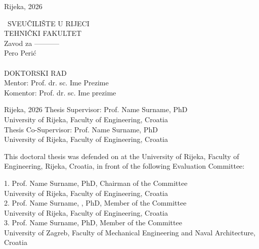 \documentclass[12pt,a4paper]{article}
\begin{document}
\vspace*{\fill}
Rijeka, 2026
\newpage
\-
\thispagestyle{empty}
\newpage

\thispagestyle{empty}
\centering

\fontsize{16}{16}\selectfont\
{SVEUČILIŠTE U RIJECI}\\

{ TEHNIČKI FAKULTET}\\

{ Zavod za -----------}\\
\vspace{5cm}
{Pero Perić}\\
\vspace{1cm}
{\fontsize{22}{22}}\\
\vspace{1cm}
{DOKTORSKI RAD}\\
\vspace{3cm}
{Mentor: Prof. dr. sc. Ime Prezime}\\
\vspace{0.4cm}
{Komentor: Prof. dr. sc. Ime prezime}



\vspace*{\fill}
Rijeka, 2026 %
\newpage
\-
\thispagestyle{empty}
\newpage
\thispagestyle{empty}
\flushleft
\normalsize
Thesis Supervisor: Prof. Name Surname, PhD\\
University of Rijeka, Faculty of Engineering, Croatia\\
\vspace{1cm}
Thesis Co-Supervisor: Prof. Name Surname, PhD\\
University of Rijeka, Faculty of Engineering, Croatia\\
\vspace{1cm}

This doctoral thesis was defended on \underline{\hspace{3cm}}at the University of Rijeka,
Faculty of Engineering, Rijeka, Croatia, in front of the following Evaluation
Committee:\\
\vspace{1cm}

1.  Prof. Name Surname, PhD, Chairman of the Committee\\
University of Rijeka, Faculty of Engineering, Croatia\\
\vspace{0.5cm}
2. Prof. Name Surname, , PhD, Member of the Committee\\
University of Rijeka, Faculty of Engineering, Croatia\\
\vspace{0.5cm}
3. Prof. Name Surname,  PhD, Member of the Committee\\
University of Zagreb, Faculty of Mechanical Engineering and Naval Architecture, Croatia
\newpage
\thispagestyle{empty}
\-
\newpage
\restoregeometry
%
\newpage
\end{document}
